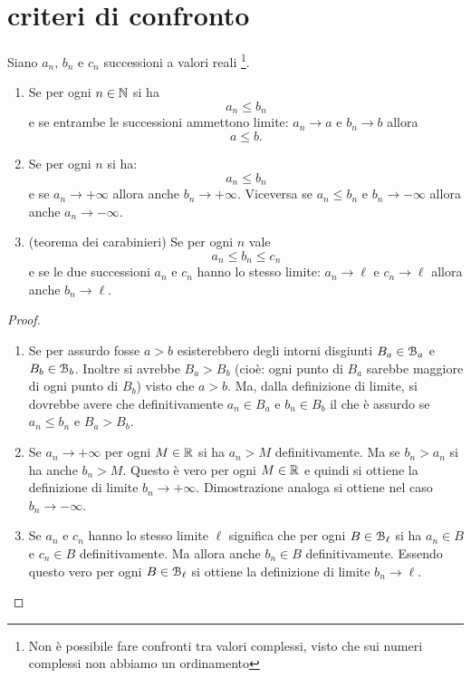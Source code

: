 \section{criteri di confronto}

\begin{theorem}
\label{th:confronto_successioni}%
%
%
%
\mymark{***}%
Siano $a_n$, $b_n$ e $c_n$ successioni a valori reali%
\footnote{Non è possibile fare confronti tra valori complessi, visto che
sui numeri complessi non abbiamo un ordinamento}.
\begin{enumerate}
\item
Se per ogni $n\in \mathbb N$ si ha
\[
a_n \le b_n
\]
e se entrambe le successioni ammettono limite: $a_n \to a$ e $b_n \to b$
allora
\[
a \le b.
\]

\item
Se per ogni $n$ si ha:
\[
a_n \le b_n
\]
e se $a_n\to +\infty$ allora anche $b_n \to +\infty$.
Viceversa se $a_n \le b_n$ e $b_n \to -\infty$ allora anche $a_n \to -\infty$.

\item
(teorema dei carabinieri)
Se per ogni $n$ vale
\[
a_n \le b_n \le c_n
\]
 e se le due
successioni $a_n$ e $c_n$ hanno lo stesso limite: $a_n \to \ell$ e $c_n\to \ell$
allora anche $b_n \to \ell$.
\end{enumerate}
\end{theorem}
%
\begin{proof}
\mymark{**}
\begin{enumerate}
\item
Se per assurdo fosse $a > b$ esisterebbero degli intorni disgiunti $B_a\in \mathcal B_a$
e $B_b \in \mathcal B_b$.
Inoltre si avrebbe $B_a > B_b$ (cioè: ogni punto di $B_a$ sarebbe maggiore
di ogni punto di $B_b$) visto che $a>b$.
Ma, dalla definizione di limite,
si dovrebbe avere che definitivamente $a_n\in B_a$ e $b_n\in B_b$ il che
è assurdo se $a_n\le b_n$ e $B_a > B_b$.

\item
Se $a_n \to +\infty$ per ogni $M\in \mathbb R$
si ha $a_n > M$ definitivamente.
Ma se $b_n>a_n$ si ha anche $b_n >M$.
Questo è vero per ogni $M\in \mathbb R$ e quindi
si ottiene la definizione di limite $b_n \to +\infty$.
Dimostrazione analoga si ottiene nel caso $b_n \to -\infty$.

\item
Se $a_n$ e $c_n$ hanno lo stesso limite $\ell$ significa che per ogni
$B \in \mathcal B_\ell$
si ha $a_n\in B$ e $c_n\in B$ definitivamente.
Ma allora anche $b_n\in B$ definitivamente. Essendo questo
vero per ogni $B\in \mathcal B_\ell$ si ottiene la definizione di limite
$b_n \to \ell$.
\end{enumerate}
\end{proof}

